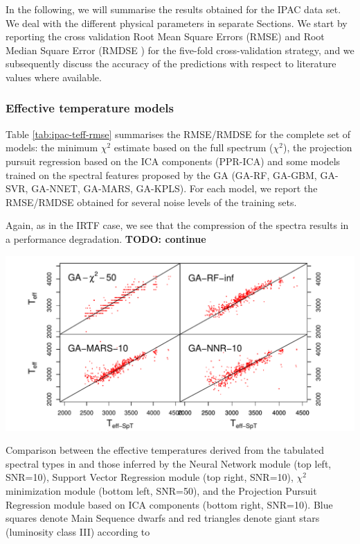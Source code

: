 
In the following, we will summarise the results obtained for the IPAC
data set. We deal with the different physical parameters in separate
Sections. We start by reporting the cross validation Root Mean Square
Errors (RMSE) and Root Median Square Error (RMDSE ) for the five-fold
cross-validation strategy, and we subsequently discuss the accuracy of
the predictions with respect to literature values where available.

\subsubsection{Effective temperature models}

Table \ref{tab:ipac-teff-rmse} summarises the RMSE/RMDSE for the
complete set of models: the minimum $\chi^2$ estimate based on the
full spectrum ($\chi^2$), the projection pursuit regression based on
the ICA components (PPR-ICA) and some models trained on the spectral
features proposed by the GA (GA-RF, GA-GBM, GA-SVR, GA-NNET, GA-MARS,
GA-KPLS). For each model, we report the RMSE/RMDSE obtained for
several noise levels of the training sets.

Again, as in the IRTF case, we see that the compression of the spectra
results in a performance degradation. {\bf TODO: continue} 

\begin {figure*}
 \centering \includegraphics[width=\textwidth]{figs/ipac-teff.pdf}
\caption{Comparison
 between the effective temperatures derived from the tabulated
 spectral types in \cite{cesetti} and those inferred by the Neural
 Network module (top left, SNR=10), Support Vector Regression module
 (top right, SNR=10), $\chi^2$ minimization module (bottom left,
 SNR=50), and the Projection Pursuit Regression module based on ICA
 components (bottom right, SNR=10).  Blue squares denote Main Sequence
 dwarfs and red triangles denote giant stars (luminosity class III)
 according to \cite{cesetti}} \label{fig:ipac_teff}
\end {figure*}



